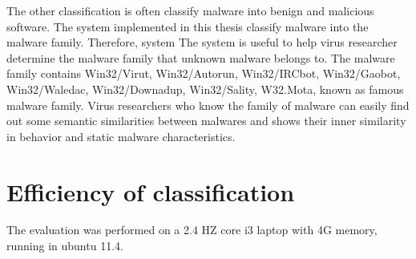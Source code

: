 The other classification is often classify malware into benign and malicious software. The system implemented in this thesis classify malware into the malware family. Therefore, system The system is useful to help virus researcher determine the malware family that unknown malware belongs to. The malware family contains Win32/Virut, Win32/Autorun, Win32/IRCbot, Win32/Gaobot, Win32/Waledac, Win32/Downadup, Win32/Sality, W32.Mota, known as famous malware family. Virus researchers who know the family of malware can easily find out some semantic similarities between malwares and shows their inner similarity in behavior and static malware characteristics.

\section{Efficiency  of classification}
The evaluation was performed on a 2.4 HZ core i3 laptop with 4G memory, running in ubuntu 11.4. 	

